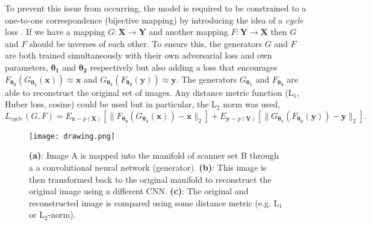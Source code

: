 To prevent this issue from occurring, the model is required to be constrained to a one-to-one correspondence (bijective mapping) by introducing the idea of a \textit{cycle} loss \citep{zhu2017unpaired}. If we have a mapping $G: \mathbf{X}\rightarrow \mathbf{Y}$ and another mapping $F: \mathbf{Y}\rightarrow \mathbf{X}$ then $G$ and $F$ should be inverses of each other. To ensure this, the generators $G$ and  $F$ are both trained simultaneously with their own adversarial loss and own parameters, $\mathbf{\theta_1}$ and $\mathbf{\theta_2}$ respectively but also adding a loss that encourages $F_\mathbf{\theta_2}(G_\mathbf{\theta_1}(\mathbf{x})) \approx \mathbf{x}$ and $G_\mathbf{\theta_1}(F_\mathbf{\theta_2}(\mathbf{y})) \approx \mathbf{y}$. The generators $G_\mathbf{\theta_1}$ and $F_\mathbf{\theta_2}$ are able to reconstruct the original set of images. Any distance metric function (L$_1$, Huber loss, cosine) could be used but in particular, the L$_2$ norm was used,
\begin{equation}
    \label{eqn: reconstuction_loss}
    L_{cycle}(G, F) =E_{\mathbf{x}\sim p(\mathbf{X})} [\| F_\mathbf{\theta_2}(G_\mathbf{\theta_1}(\mathbf{x})) - \mathbf{x}\|_2] +E_{\mathbf{y}\sim p(\mathbf{Y})} [\| G_\mathbf{\theta_1}(F_\mathbf{\theta_2}(\mathbf{y})) - \mathbf{y}\|_2].
\end{equation}
\begin{figure}[htp]
\begin{center}
 \texttt{[image: drawing.png]}
    \end{center}
  \caption{\textbf{(a)}: Image A is mapped into the manifold of scanner set B through a a convolutional neural network (generator). \textbf{(b)}: This image is then transformed back to the original manifold to reconstruct the original image using a different CNN. \textbf{(c)}: The original and reconstructed image is compared using some distance metric (e.g. L$_1$ or L$_2$-norm).}
  \label{fig:pca_tsne}
\end{figure}

